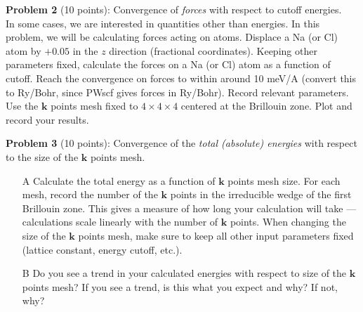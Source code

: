 \documentclass[12pt]{article}
\begin{document}

  \noindent
  {\bf Problem 2} (10 points):
  Convergence of {\em forces} with respect to cutoff energies. \\

  \noindent
  In some cases, we are interested in quantities other than energies.
  In this problem, we will be calculating forces acting on atoms.
  Displace a Na (or Cl) atom by $+0.05$ in the $z$ direction (fractional coordinates).
  Keeping other parameters fixed, calculate the forces on a Na (or Cl) atom as a
  function of cutoff.
  Reach the convergence on forces to within around 10 meV/A
  (convert this to Ry/Bohr, since PWscf gives forces in Ry/Bohr).
  Record relevant parameters. Use the $\mathbf{k}$ points mesh fixed to $4 \times 4 \times 4$ centered at the Brillouin zone.
  Plot and record your results.
  \vspace{10mm}



  \newpage

  \noindent
  {\bf Problem 3} (10 points):
  Convergence of the {\em total (absolute) energies} with respect to the size of the $\mathbf{k}$ points mesh.

  \begin{itemize}

    \item[A]
    Calculate the total energy as a function of $\mathbf{k}$ points mesh size.
    For each mesh, record the number of the $\mathbf{k}$ points in the irreducible wedge of the first Brillouin zone.
    This gives a measure of how long your calculation will take --- calculations
    scale linearly with the number of $\mathbf{k}$ points.
    When changing the size of the $\mathbf{k}$ points mesh, make sure to keep all other
    input parameters fixed (lattice constant, energy cutoff, etc.).

    \item[B]
    Do you see a trend in your calculated energies with respect to size of the $\mathbf{k}$ points mesh? If you see a trend, is this what you expect and why? If not, why?

  \end{itemize}
  \vspace{6mm}



\end{document}
